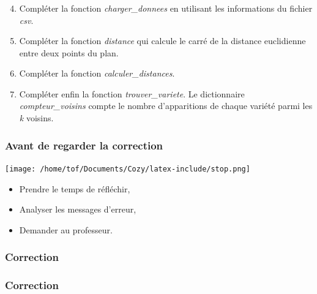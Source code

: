 \documentclass[svgnames,11pt]{beamer}
\begin{document}
\begin{frame}
    \frametitle{}
    \setcounter{compteuractivite}{2}

    \begin{activite}

        \begin{enumerate}
            \setcounter{enumi}{3}

            \item Compléter la fonction \emph{charger\_donnees} en utilisant les informations du fichier \emph{csv}.
            \item Compléter la fonction \emph{distance} qui calcule le carré de la distance euclidienne entre deux points du plan.
            \item Compléter la fonction \emph{calculer\_distances}.
            \item Compléter enfin la fonction \emph{trouver\_variete}. Le dictionnaire \emph{compteur\_voisins} compte le nombre d'apparitions de chaque variété parmi les \emph{k} voisins.
        \end{enumerate}
    \end{activite}

\end{frame}
\begin{frame}
    \frametitle{Avant de regarder la correction}
\begin{center}
    \centering
    \texttt{[image: /home/tof/Documents/Cozy/latex-include/stop.png]}
    \end{center}
{\Large
    \begin{itemize}
        \item Prendre le temps de réfléchir,
        \item Analyser les messages d'erreur,
        \item Demander au professeur.
    \end{itemize}
}
\end{frame}
\begin{frame}
    \frametitle{Correction}

    

\end{frame}
\begin{frame}
    \frametitle{Correction}

    

\end{frame}
\end{document}
